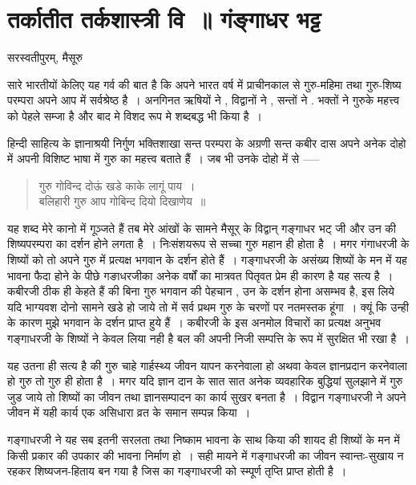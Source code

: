 {\fontsize{16}{18}\selectfont
\presetvalues
\chapter{तर्कातीत तर्कशास्त्री वि~॥ गंङ्गाधर भट्ट}

\begin{center}
\smallskip
सरस्वतीपुरम्,
\smallskip
मैसूरु
\addrule
\end{center}
सारे भारतीयों केलिए यह गर्व की बात है कि अपने भारत वर्ष में प्राचीनकाल से गुरु-महिमा तथा गुरु-शिष्य परम्परा अपने आप में सर्वश्रेष्ठ है~। अनगिनत ऋषियों ने , विद्वानों ने , सन्तों ने . भक्तों ने गुरुके महत्त्व को पेहले सम्जा है और बाद मे विशद रूप मे शब्दबद्ध भी किया है~। 

हिन्दी साहित्य के ज्ञानाश्रयी निर्गुण भक्तिशाखा सन्त परम्परा के अग्रणी सन्त कबीर दास अपने अनेक दोहो में अपनी विशिष्ट भाषा में गुरु का महत्त्व बताते हैं~। जब भी उनके दोहो में से ----- 
\begin{verse}
गुरु गोविन्द दोऊं खडे काके लागूं पाय~।\\	
बलिहारी गुरु आप गोबिन्द दियो दिखाणेय~॥
\end{verse}
यह शब्द मेरे कानो में गूञ्जते हैं तब मेरे आंखों के सामने मैसूर् के विद्वान् गङ्गाधर भट् जी और उन की शिष्यपरम्परा का दर्शन होने लगता है~। निःसंशयरूप से सच्चा गुरु महान ही होता है~। मगर गंगाधरजी के शिष्यों को तो अपने गुरु में प्रत्यक्ष भगवान के दर्शन होते हैं~। गङ्गाधरजी के असंख्य शिष्यों के मन में यह भावना फैदा होने के पीछे गङाधरजीका अनेक वर्षों का मात्रवत पितृवत प्रेम ही कारण है यह सत्य है~। कबीरजी ठीक ही केहते हैं की बिना गुरु भगवान की पेहचान , उन के दर्शन होना असम्भव है, इस लिये यदि भाग्यवश दोनो सामने खडे हो जाये तो में सर्व  प्रथम गुरु के चरणों पर नतमस्तक हूंगा~। क्यूं कि उन्ही के कारण मुझे भगवान के दर्शन प्राप्त हुये हैं~। कबीरजी के इस अनमोल विचारों का प्रत्यक्ष अनुभव गङ्गाधरजी के शिष्यों ने केवल लिया नही है बल की अपनी निजी सम्पत्ति के रूप में सुरक्षित भी रखा है~। 

यह उतना ही सत्य है की गुरु चाहे गार्हस्थ्य जीवन यापन करनेवाला हो अथवा केवल ज्ञानप्रदान करनेवाला हो गुरु तो गुरु ही होता है~। मगर यदि ज्ञान दान के सात सात अनेक व्यवहारिक बुद्धियां सुलझाने में गुरु जुड जाये तो शिष्यों का जीवन तथा ज्ञानसम्पादन का कार्य सुखर बनता है~। विद्वान गङ्गाधरजी ने अपने जीवन में यही कार्य एक असिधारा व्रत के समान सम्पन्न किया~। 

गङ्गाधरजी ने यह सब इतनी सरलता तथा निष्काम भावना के साथ किया की शायद ही शिष्यों के मन में किसी प्रकार की उपकार की भावना निर्माण हो~। सही मायने में गङ्गाधरजी का जीवन स्वान्तः-सुखाय न रहकर शिष्यजन-हिताय बन गया है जिस का गङ्गाधरजी को स्म्पूर्ण तृप्ति प्राप्त होती है~।

}
